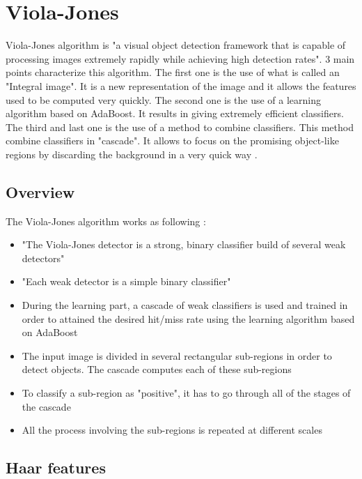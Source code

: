 \chapter{Viola-Jones}

\noindent Viola-Jones algorithm is "a visual object detection framework that is capable of processing images extremely rapidly while achieving high detection rates". 3 main points characterize this algorithm. The first one is the use of what is called an "Integral image". It is a new representation of the image and it allows the features used to be computed very quickly. The second one is the use of a learning algorithm based on AdaBoost. It results in giving extremely efficient classifiers. The third and last one is the use of a method to combine classifiers. This method combine classifiers in "cascade". It allows to focus on the promising object-like regions by discarding the background in a very quick way \cite{VIO01}.
\newline

\section{Overview}

\vspace{\baselineskip}
\noindent The Viola-Jones algorithm works as following \cite{DIN08}:

\begin{itemize}
  \item "The Viola-Jones detector is a strong, binary classifier build of several weak detectors"
  \item "Each weak detector is a simple binary classifier"
  \item During the learning part, a cascade of weak classifiers is used and trained in order to attained the desired hit/miss rate using the learning algorithm based on AdaBoost
  \item The input image is divided in several rectangular sub-regions in order to detect objects. The cascade computes each of these sub-regions
  \item To classify a sub-region as "positive", it has to go through all of the stages of the cascade
  \item All the process involving the sub-regions is repeated at different scales
\end{itemize}

\section{Haar features}

